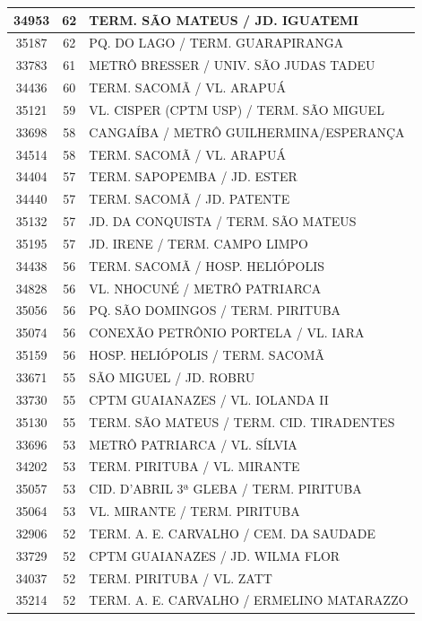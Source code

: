 \documentclass[
	12pt,				%
	oneside,			%
	a4paper,			%
	english,			%
	brazil				%
	]{abntex2ppgsi}
\begin{document}
{{\begin{apendicesenv}
\begin{longtable}{c|c|p{7cm}}
 \hline 
34953 &	62 &	TERM. SÃO MATEUS / JD. IGUATEMI \\ 
 \hline 
35187 &	62 &	PQ. DO LAGO / TERM. GUARAPIRANGA \\ 
 \hline 
33783 &	61 &	METRÔ BRESSER / UNIV. SÃO JUDAS TADEU \\ 
 \hline 
34436 &	60 &	TERM. SACOMÃ / VL. ARAPUÁ \\ 
 \hline 
35121 &	59 &	VL. CISPER (CPTM USP) / TERM. SÃO MIGUEL \\ 
 \hline 
33698 &	58 &	CANGAÍBA / METRÔ GUILHERMINA/ESPERANÇA \\ 
 \hline 
34514 &	58 &	TERM. SACOMÃ / VL. ARAPUÁ \\ 
 \hline 
34404 &	57 &	TERM. SAPOPEMBA / JD. ESTER \\ 
 \hline 
34440 &	57 &	TERM. SACOMÃ / JD. PATENTE \\ 
 \hline 
35132 &	57 &	JD. DA CONQUISTA / TERM. SÃO MATEUS \\ 
 \hline 
35195 &	57 &	JD. IRENE / TERM. CAMPO LIMPO \\ 
 \hline 
34438 &	56 &	TERM. SACOMÃ / HOSP. HELIÓPOLIS \\ 
 \hline 
34828 &	56 &	VL. NHOCUNÉ / METRÔ PATRIARCA \\ 
 \hline 
35056 &	56 &	PQ. SÃO DOMINGOS / TERM. PIRITUBA \\ 
 \hline 
35074 &	56 &	CONEXÃO PETRÔNIO PORTELA / VL. IARA \\ 
 \hline 
35159 &	56 &	HOSP. HELIÓPOLIS / TERM. SACOMÃ \\ 
 \hline 
33671 &	55 &	SÃO MIGUEL / JD. ROBRU \\ 
 \hline 
33730 &	55 &	CPTM GUAIANAZES / VL. IOLANDA II \\ 
 \hline 
35130 &	55 &	TERM. SÃO MATEUS / TERM. CID. TIRADENTES \\ 
 \hline 
33696 &	53 &	METRÔ PATRIARCA / VL. SÍLVIA \\ 
 \hline 
34202 &	53 &	TERM. PIRITUBA / VL. MIRANTE \\ 
 \hline 
35057 &	53 &	CID. D’ABRIL 3ª GLEBA / TERM. PIRITUBA \\ 
 \hline 
35064 &	53 &	VL. MIRANTE / TERM. PIRITUBA \\ 
 \hline 
32906 &	52 &	TERM. A. E. CARVALHO / CEM. DA SAUDADE \\ 
 \hline 
33729 &	52 &	CPTM GUAIANAZES / JD. WILMA FLOR \\ 
 \hline 
34037 &	52 &	TERM. PIRITUBA / VL. ZATT \\ 
 \hline 
35214 &	52 &	TERM. A. E. CARVALHO / ERMELINO MATARAZZO \\ 

\end{longtable}
\end{apendicesenv}}}
\end{document}
